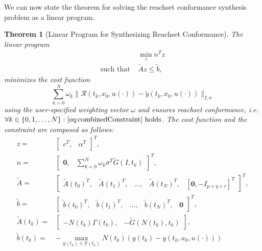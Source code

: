 \documentclass[EPiC]{easychair}
\renewcommand{\^}[1]{^{(#1)}}
\newtheorem{theorem}{Theorem}
\begin{document}
We can now state the theorem for solving the reachset conformance synthesis problem as a linear program.
\begin{theorem}[Linear Program for Synthesizing Reachset Conformance] \label{thm:linearProgram}
 The linear program
 \begin{equation} \label{eq:standardForm}
    \begin{split}
    & \min_z n^T z \\
    \text{such that } & \tilde{A} z \leq \tilde{b},
    \end{split}
 \end{equation}
 minimizes the cost function
 \begin{equation} \label{eq:costFunction}
    \sum_{k=0}^{N} \omega_k \|\mathcal{R}(t_k,x_0,u(\cdot)) - \tilde{y}(t_k,x_0,u(\cdot))\|_{I,\sigma}
 \end{equation}
 using the user-specified weighting vector $\omega$ and ensures reachset conformance, i.e. $\forall k\in\{0,1,\ldots, N\}:  \eqref{eq:combinedConstraint} \text{ holds}$. The cost function and the constraint are composed as follows:
 \begin{align}
  z =& \begin{bmatrix} c^T, & \alpha^T \end{bmatrix}^T, \label{eq:z} \\
  n =& \begin{bmatrix} \mathbf{0}, & \sum_{k=0}^{N} \omega_k \sigma^T \tilde{G}(I,t_k) \end{bmatrix}^T, \\
  \tilde{A} =& \begin{bmatrix}
            \tilde{A}(t_0)^T, & \tilde{A}(t_1)^T, & \ldots, & \tilde{A}(t_N)^T, & [\mathbf{0}, -I_{p+q+r}]^T
           \end{bmatrix}^T, \label{eq:combined_A}\\
  \tilde{b} =& \begin{bmatrix}
            \tilde{b}(t_0)^T, & \tilde{b}(t_1)^T, & \ldots, & \tilde{b}(t_N)^T, & \mathbf{0}
           \end{bmatrix}^T, \label{eq:combined_b} \\
  \tilde{A}(t_k) = & \begin{bmatrix} 
            -N(t_k)\Gamma(t_k), & -\tilde{G}(N(t_k),t_k)
           \end{bmatrix}, \label{eq:tilde_A} \\
  \tilde{b}(t_k) =& - \max_{y(t_k) \in \mathcal{Y}(t_k)}
  N(t_k) (y(t_k) - y(t_k,x_0,u(\cdot))) \label{eq:tilde_b} \\

\end{align}
\end{theorem}
\end{document}
